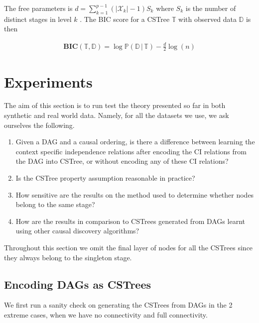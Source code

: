 \documentclass{tufte-book}
\begin{document}
The free parameters is \(d=\sum_{k=1}^{p-1} (|\mathcal{X}_k| - 1)S_k\) where \(S_k\) is the number of distinct stages in level \(k\) \cite{duarte-2021-repres-learn}. The  BIC score for a CSTree \(\mathbb{T}\) with observed data \(\mathbb{D}\) is then

\begin{align*}
\textbf{BIC}(\mathbb{T},\mathbb{D}) = \log\mathbb{P}(\mathbb{D}\,|\,\mathbb{T}) - \frac{d}{2}\log(n)
\end{align*}



\chapter{Experiments}
\label{sec:org76c2d6d}
The aim of this section is to run test the theory presented so far in both synthetic and real world data. Namely, for all the datasets we use, we ask ourselves the following.

\begin{enumerate}
\item Given a DAG and a causal ordering, is there a difference between learning the context specific independence relations after encoding the CI relations from the DAG into CSTree, or without encoding any of these CI relations?
\item Is the CSTree property assumption reasonable in practice?
\item How sensitive are the results on the method used to determine whether nodes belong to the same stage?
\item How are the results in comparison to CSTrees generated from DAGs learnt using other causal discovery algorithms?
\end{enumerate}


Throughout this section we omit the final layer of nodes for all the CSTrees since they always belong to the singleton stage.


\section{Encoding DAGs as CSTrees}
\label{sec:org6382bbb}
We first run a sanity check on generating the CSTrees from DAGs in the 2 extreme cases, when we have no connectivity and full connectivity.
\end{document}

